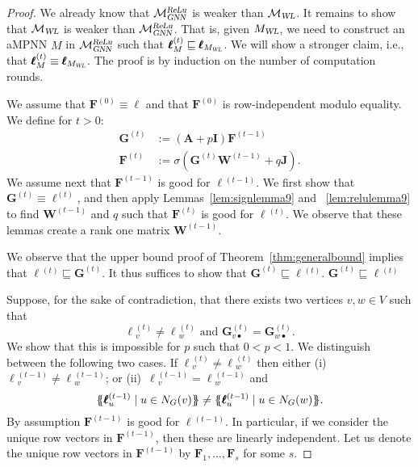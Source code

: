 \begin{proof}
We already know that $\mathcal{M}_{\textsl{GNN}}^{\textsl{ReLu}}$ is weaker than $\mathcal{M}_{\textsl{WL}}$. It remains to show that $\mathcal{M}_{\textsl{WL}}$ is weaker than $\mathcal{M}_{\textsl{GNN}}^{\textsl{ReLu}}$. That is, given $M_{\textsl{WL}}$, we need to construct an aMPNN $M$ in $\mathcal{M}_{\textsl{GNN}}^{\textsl{ReLu}}$ such that 
$\pmb{\ell}_{M}^{(t)}\sqsubseteq \pmb{\ell}_{M_{\textsl{WL}}}$. We will show a stronger claim, i.e., that $\pmb{\ell}_{M}^{(t)}\equiv \pmb{\ell}_{M_{\textsl{WL}}}$. The proof is by induction on the number of computation rounds.

We assume that $\mathbf{F}^{(0)}\equiv\pmb{\ell}$ and that  $\mathbf{F}^{(0)}$ is row-independent modulo equality. We define for $t>0$:
	\begin{align*}
	\mathbf{G}^{(t)}&:=(\mathbf{A}+p\mathbf{I})\mathbf{F}^{(t-1)}\\
	\mathbf{F}^{(t)}&:=\sigma(\mathbf{G}^{(t)}\mathbf{W}^{(t-1)}+q\mathbf{J}).
	\end{align*}
We assume next that $\mathbf{F}^{(t-1)}$ is good for $\pmb{\ell}{}^{(t-1)}$. We first show that
$\mathbf{G}^{(t)}\equiv\pmb{\ell}^{(t)}$, and then apply
	Lemmas~\ref{lem:signlemma9} and
	~\ref{lem:relulemma9} to find $\mathbf{W}^{(t-1)}$ and $q$ such that $\mathbf{F}^{(t)}$ is good for  $\pmb{\ell}{}^{(t)}$. We observe that these lemmas create a rank one matrix $\mathbf{W}^{(t-1)}$.


We observe that the upper bound proof of Theorem~\ref{thm:generalbound}  implies that  $\pmb{\ell}{}^{(t)}\sqsubseteq \mathbf{G}^{(t)}$. It thus suffices to show that $ \mathbf{G}^{(t)}\sqsubseteq \pmb{\ell}{}^{(t)}$. 
$ \mathbf{G}^{(t)}\sqsubseteq \pmb{\ell}{}^{(t)}$

Suppose, for the sake of contradiction, that there exists two vertices $v,w\in V$ such that 
	\begin{equation}
	\pmb{\ell}{}^{(t)}_v\neq\pmb{\ell}{}^{(t)}_w \text{ and }
	\mathbf{G}^{(t)}_{v\bullet}=\mathbf{G}^{(t)}_{w\bullet}. \label{eq:contra}
	\end{equation} 
We show that this is impossible for $p$ such that $0<p<1$. We distinguish between the following two cases. If $\pmb{\ell}{}^{(t)}_v\neq\pmb{\ell}{}^{(t)}_w$ then either
(i)~$\pmb{\ell}{}^{(t-1)}_v\neq\pmb{\ell}{}^{(t-1)}_w$; or 
(ii)~$\pmb{\ell}{}^{(t-1)}_v=\pmb{\ell}{}^{(t-1)}_w$ and
	$$
	\ldbl \pmb{\ell}{}^{(t-1)}_{u} \st u \in N_G(v) \rdbl\neq
	\ldbl \pmb{\ell}{}^{(t-1)}_{u} \st u \in N_G(w) \rdbl.
	$$
By assumption $\mathbf{F}^{(t-1)}$ is good for $\pmb{\ell}{}^{(t-1)}$.
In particular, if we consider the unique row vectors in  $\mathbf{F}^{(t-1)}$, then these are linearly independent. Let us denote the unique row vectors in $\mathbf{F}^{(t-1)}$ by $\mathbf{F}_1,\ldots,\mathbf{F}_s$ for some $s$.



\end{proof}
